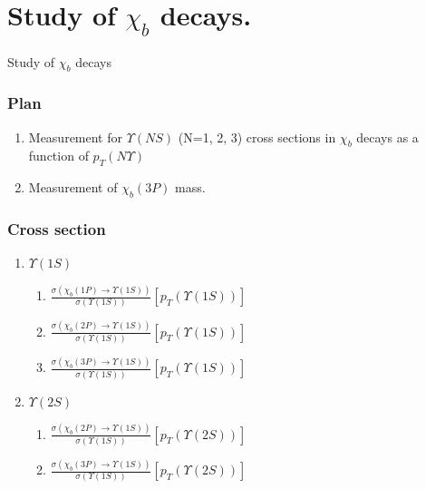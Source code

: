 \documentclass{beamer}
\begin{document}
\section{Study of $\chi_{b}$ decays.}
\begin{frame}
\begin{exampleblock}{}
    \begin{center}
        {\huge Study of $\chi_{b}$ decays}
    \end{center}
\end{exampleblock}
\end{frame}
\begin{frame}
\frametitle{Plan}
\begin{enumerate}
  \item Measurement for $\Upsilon(NS)$ (N=1, 2, 3) cross sections in $\chi_b$ decays as a function of $p_T(N\Upsilon)$
  \item Measurement of $\chi_{b}(3P)$ mass.
\end{enumerate}
\end{frame}
\begin{frame}
\frametitle{Cross section}
\begin{enumerate}
  \item $\Upsilon(1S)$
    \begin{enumerate}
      \item $\frac{\sigma(\chi_b(1P) \rightarrow \Upsilon(1S))}{\sigma(\Upsilon(1S))}[p_T(\Upsilon(1S))]$
      \item $\frac{\sigma(\chi_b(2P) \rightarrow \Upsilon(1S))}{\sigma(\Upsilon(1S))}[p_T(\Upsilon(1S))]$
      \item $\frac{\sigma(\chi_b(3P) \rightarrow \Upsilon(1S))}{\sigma(\Upsilon(1S))}[p_T(\Upsilon(1S))]$
    \end{enumerate}
  \item $\Upsilon(2S)$
    \begin{enumerate}
      \item $\frac{\sigma(\chi_b(2P) \rightarrow \Upsilon(1S))}{\sigma(\Upsilon(1S))}[p_T(\Upsilon(2S))]$
      \item $\frac{\sigma(\chi_b(3P) \rightarrow \Upsilon(1S))}{\sigma(\Upsilon(1S))}[p_T(\Upsilon(2S))]$
    \end{enumerate}
\end{enumerate}
\end{frame}
\end{document}
